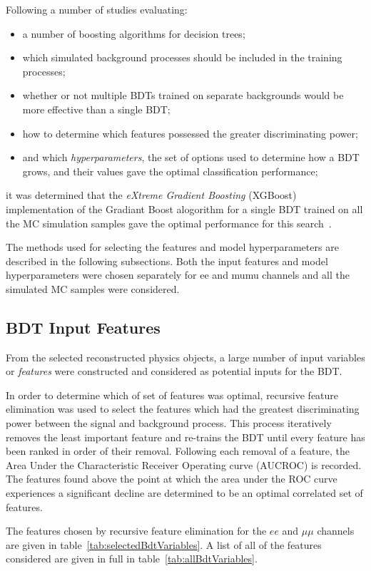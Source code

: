 Following a number of studies evaluating:

\begin{itemize}
\item a number of boosting algorithms for decision trees;
\item which simulated background processes should be included in the training processes;
\item whether or not multiple BDTs trained on separate backgrounds would be more effective than a single BDT;
\item how to determine which features possessed the greater discriminating power;
\item and which \emph{hyperparameters}, the set of options used to determine how a BDT grows, and their values gave the optimal classification performance;
\end{itemize}

it was determined that the \emph{eXtreme Gradient Boosting} (XGBoost) implementation of the Gradiant Boost alogorithm for a single BDT trained on all the MC simulation samples gave the optimal performance for this search~\cite{xgboost}.

The methods used for selecting the features and model hyperparameters are described in the following subsections.
Both the input features and model hyperparameters were chosen separately for ee and mumu channels and all the simulated MC samples were considered.

\subsection{BDT Input Features}
From the selected reconstructed physics objects, a large number of input variables or \emph{features} were constructed and considered as potential inputs for the BDT.

In order to determine which of set of features was optimal, recursive feature elimination was used to select the features which had the greatest discriminating power between the signal and background process.
This process iteratively removes the least important feature and re-trains the BDT until every feature has been ranked in order of their removal.
Following each removal of a feature, the Area Under the Characteristic Receiver Operating curve (AUCROC) is recorded.
The features found above the point at which the area under the ROC curve experiences a significant decline are determined to be an optimal correlated set of features.
 
The features chosen by recursive feature elimination for the $ee$ and $\mu\mu$ channels are given in table~\ref{tab:selectedBdtVariables}.
A list of all of the features considered are given in full in table~\ref{tab:allBdtVariables}.

